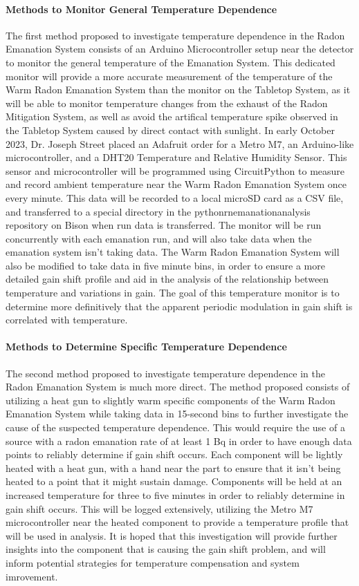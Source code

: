 \documentclass[letterpaper,12pt]{article}
\begin{document}
\paragraph*{Methods to Monitor General Temperature Dependence} 
The first method proposed to investigate temperature dependence in the Radon 
Emanation System consists of an Arduino Microcontroller setup near the detector 
to monitor the general temperature of the Emanation System. 
This dedicated monitor will provide a more accurate measurement of the 
temperature of the Warm Radon Emanation System than the monitor on the Tabletop
System, as it will be able to monitor temperature changes from the exhaust of 
the Radon Mitigation System, as well as avoid the artifical temperature spike 
observed in the Tabletop System caused by direct contact with sunlight.
In early October 2023, Dr. Joseph Street placed an Adafruit order for a Metro
M7, an Arduino-like microcontroller, and a DHT20 Temperature and Relative 
Humidity Sensor. 
This sensor and microcontroller will be programmed using CircuitPython to 
measure and record ambient temperature near the Warm Radon Emanation System once every
minute. 
This data will be recorded to a local microSD card as a CSV file, and 
transferred to a special directory in the pythonrnemanationanalysis repository 
on Bison when run data is transferred.
The monitor will be run concurrently with each emanation run, and will also take
data when the emanation system isn't taking data.
The Warm Radon Emanation System will also be modified to take data in five minute 
bins, in order to ensure a more detailed gain shift profile and aid in the 
analysis of the relationship between temperature and variations in gain.
The goal of this temperature monitor is to determine more definitively that the
apparent periodic modulation in gain shift is correlated with temperature.

\paragraph*{Methods to Determine Specific Temperature Dependence}
The second method proposed to investigate temperature dependence in the Radon 
Emanation System is much more direct. 
The method proposed consists of utilizing a heat gun to slightly warm specific 
components of the Warm Radon Emanation System while taking data in 15-second bins to 
further investigate the cause of the suspected temperature dependence.
This would require the use of a source with a radon emanation rate of at least 
1 Bq in order to have enough data points to reliably determine if gain shift 
occurs.
Each component will be lightly heated with a heat gun, with a hand near the part
to ensure that it isn't being heated to a point that it might sustain damage.
Components will be held at an increased temperature for three to five minutes in
order to reliably determine in gain shift occurs. 
This will be logged extensively, utilizing the Metro M7 microcontroller near 
the heated component to provide a temperature profile that will be used in 
analysis. 
It is hoped that this investigation will provide further insights into the 
component that is causing the gain shift problem, and will inform potential 
strategies for temperature compensation and system imrovement.
\end{document}

